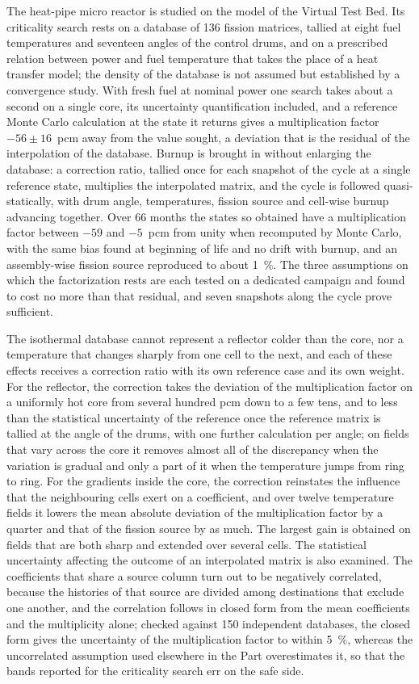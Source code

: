 The heat-pipe micro reactor is studied on the model of the Virtual Test Bed.
Its criticality search rests on a database of 136 fission matrices, tallied at
eight fuel temperatures and seventeen angles of the control drums, and on a
prescribed relation between power and fuel temperature that takes the place of
a heat transfer model; the density of the database is not assumed but established
by a convergence study. With fresh fuel at nominal power one search takes about
a second on a single core, its uncertainty quantification included, and a
reference Monte Carlo calculation at the state it returns gives a
multiplication factor $-56\pm16$~pcm away from the value sought, a deviation
that is the residual of the interpolation of the database. Burnup is brought
in without enlarging the database: a correction ratio, tallied once for each
snapshot of the cycle at a single reference state, multiplies the interpolated
matrix, and the cycle is followed quasi-statically, with drum angle,
temperatures, fission source and cell-wise burnup advancing together. Over
66 months the states so obtained have a multiplication factor between
$-59$ and $-5$~pcm from unity when recomputed by Monte Carlo, with the same
bias found at beginning of life and no drift with burnup, and an assembly-wise
fission source reproduced to about \SI{1}{\percent}. The three assumptions on
which the factorization rests are each tested on a dedicated campaign and
found to cost no more than that residual, and seven snapshots along the cycle
prove sufficient.

The isothermal database cannot represent a reflector colder than the core, nor
a temperature that changes sharply from one cell to the next, and each of these
effects receives a correction ratio with its own reference case and its own
weight. For the reflector, the correction takes the deviation of the
multiplication factor on a uniformly hot core from several hundred pcm down to
a few tens, and to less than the statistical uncertainty of the reference once
the reference matrix is tallied at the angle of the drums, with one further
calculation per angle; on fields that vary across the core it removes
almost all of the discrepancy when the variation is gradual and only a part of
it when the temperature jumps from ring to ring. For the gradients inside the
core, the correction reinstates the influence that the neighbouring cells exert
on a coefficient, and over twelve temperature fields it lowers the mean
absolute deviation of the multiplication factor by a quarter and that of the
fission source by as much. The largest gain is obtained on fields that are both
sharp and extended over several cells. The statistical uncertainty affecting
the outcome of an interpolated matrix is also examined. The
coefficients that share a source column turn out to be negatively correlated,
because the histories of that source are divided among destinations that
exclude one another, and the correlation follows in closed form from the mean
coefficients and the multiplicity alone; checked against 150 independent
databases, the closed form gives the uncertainty of the multiplication factor
to within \SI{5}{\percent}, whereas the uncorrelated assumption used elsewhere in
the Part overestimates it, so that the bands reported for the criticality
search err on the safe side.

